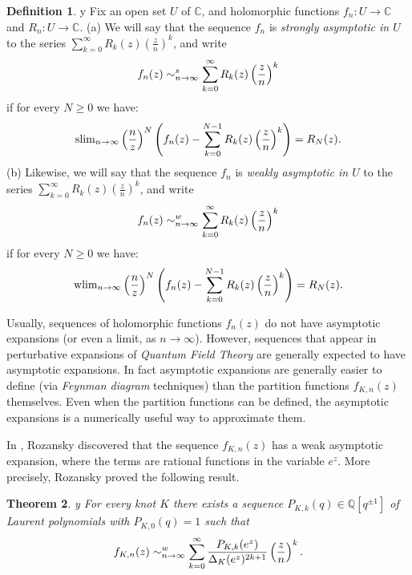 \documentclass{amsart}
\newtheorem{theorem}{Theorem}[section]
\theoremstyle{definition}
\newtheorem{definition}[theorem]{Definition}
\def\printname#1{
    \if\draft y
        \smash{\makebox[0pt]{\hspace{-0.5in}
            \raisebox{8pt}{\tt\tiny #1}}}
    \fi
}
\def\lbl#1{\label{#1}\printname{#1}}
\def\BQ{\mathbb Q}
\def\BC{\mathbb C}
\def\D{\Delta}
\def\longto{\longrightarrow}
\def\slim{\mathrm{slim}}
\def\wlim{\mathrm{wlim}}
\begin{document}
\begin{definition}
\lbl{def.ass} Fix an open set $U$ of $\BC$, and holomorphic
functions $f_n:U \longto \BC$ and $R_n: U \longto \BC$.
\newline
\rm{(a)} We will say
that the sequence $f_n$ is {\em strongly asymptotic in $U$} to the
series $ \sum_{k=0}^\infty R_k(z) \left(\frac{z}{n}\right)^k $, and
write
\begin{equation}
\lbl{eq.defstrongass}
f_n(z) \sim^s_{n \to \infty}
\sum_{k=0}^\infty
R_k(z) \left(\frac{z}{n}\right)^k
\end{equation}
if for every $N \geq 0$ we have:
\begin{equation}
\lbl{eq.assstrong}
\slim_{n\to\infty}
\left( \frac{n}{z} \right)^{N} \left(
f_n(z)-\sum_{k=0}^{N-1}
R_k(z) \left(\frac{z}{n}\right)^k
\right)=R_{N}(z).
\end{equation}
\rm{(b)}
Likewise, we will say
that the sequence $f_n$ is {\em weakly asymptotic in $U$} to the
series $ \sum_{k=0}^\infty R_k(z) \left(\frac{z}{n}\right)^k $, and
write
\begin{equation}
\lbl{eq.defweakass}
f_n(z) \sim^w_{n \to \infty}
\sum_{k=0}^\infty
R_k(z) \left(\frac{z}{n}\right)^k
\end{equation}
if for every $N \geq 0$ we have:
\begin{equation}
\lbl{eq.assweak}
\wlim_{n\to\infty}
\left( \frac{n}{z} \right)^{N} \left(
f_n(z)-\sum_{k=0}^{N-1}
R_k(z) \left(\frac{z}{n}\right)^k
\right)=R_{N}(z).
\end{equation}
\end{definition}

Usually, sequences of holomorphic functions $f_n(z)$ do not have
asymptotic expansions (or even a limit, as $n \to \infty$). However,
sequences that appear in perturbative expansions of {\em Quantum
Field Theory} are generally expected to have asymptotic expansions.
In fact asymptotic expansions are generally easier to define (via
{\em Feynman diagram} techniques) than the partition functions
$f_{K,n}(z)$ themselves. Even when the partition functions can be
defined, the asymptotic expansions is a numerically useful way to
approximate them.



In \cite{Ro1},
Rozansky discovered that the sequence $f_{K,n}(z)$ has a weak asymptotic
expansion, where the terms are rational functions in the variable $e^z$.
More precisely, Rozansky proved the following result.

\begin{theorem}
\lbl{thm.Zrat}\cite{Ro1}
For every knot $K$ there exists a sequence  $P_{K,k}(q) \in \BQ[q^{\pm 1}]$
of Laurent polynomials with $P_{K,0}(q)=1$ such that
\begin{equation}
\lbl{eq.Zrat}
f_{K,n}(z) \sim_{n \to \infty}^w
\sum_{k=0}^\infty
\frac{P_{K,k}(e^{z})}{\D_K(e^{z})^{2k+1}} \left(\frac{z}{n}\right)^k .
\end{equation}
\end{theorem}
\end{document}

